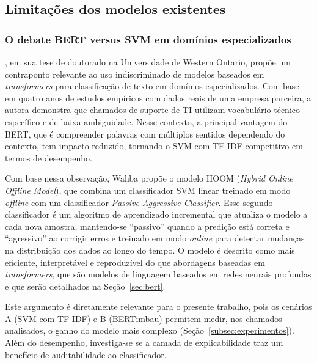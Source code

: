 \documentclass[
    12pt,                %
    openright,           %
    oneside,             %
    a4paper,             %
    english,             %
    brazil               %
]{abntex2}
\begin{document}
\subsection{Limitações dos modelos existentes}
\label{subsec:helpdesk_limitacoes}

\subsubsection{O debate BERT versus SVM em domínios especializados}
\label{subsubsec:helpdesk_debate}

, em sua tese de doutorado na Universidade de Western Ontario, propõe um contraponto relevante ao uso indiscriminado de modelos baseados em \textit{transformers} para classificação de texto em domínios especializados. Com base em quatro anos de estudos empíricos com dados reais de uma empresa parceira, a autora demonstra 
que chamados de suporte de TI utilizam vocabulário técnico específico 
e de baixa ambiguidade. Nesse contexto, a principal vantagem do BERT, que é compreender 
palavras com múltiplos sentidos dependendo do contexto, tem impacto 
reduzido, tornando o SVM com TF-IDF competitivo em termos de 
desempenho.

Com base nessa observação, Wahba propõe o modelo HOOM 
(\textit{Hybrid Online Offline Model}), que combina um classificador SVM linear treinado em modo \textit{offline} com um classificador \textit{Passive Aggressive Classifier}. Esse segundo classificador 
é um algoritmo de aprendizado incremental que atualiza o modelo a cada nova amostra, mantendo-se ``passivo'' quando a predição está correta e ``agressivo'' ao corrigir erros e treinado em modo 
\textit{online} para detectar mudanças na distribuição dos dados ao longo do tempo. O modelo é descrito como mais eficiente, interpretável e reproduzível 
do que abordagens baseadas em \textit{transformers}, que são modelos 
de linguagem baseados em redes neurais profundas e que serão 
detalhados na Seção~\ref{sec:bert}.

Este argumento é diretamente relevante para o presente trabalho, pois os cenários A (SVM com TF-IDF) e B (BERTimbau) permitem medir, nos chamados analisados, o ganho do modelo mais complexo (Seção~\ref{subsec:experimentos}). Além do desempenho, investiga-se se a camada de explicabilidade traz um benefício de auditabilidade ao classificador.


\end{document}
